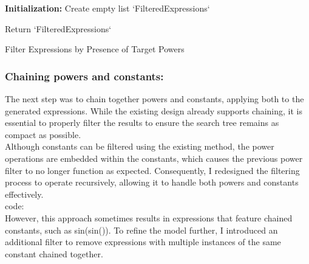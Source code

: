 \documentclass{article}
\begin{document}
\begin{algorithm}[H]
\SetAlgoLined
{}

\textbf{Initialization:}\;
Create empty list `FilteredExpressions`\;


Return `FilteredExpressions`\;

\caption{Filter Expressions by Presence of Target Powers}
\label{alg:filter_powers} %
\end{algorithm}



\subsubsection{Chaining powers and constants:}

The next step was to chain together powers and constants, applying both to the generated expressions. While the existing design already supports chaining, it is essential to properly filter the results to ensure the search tree remains as compact as possible.\\

Although constants can be filtered using the existing method, the power operations are embedded within the constants, which causes the previous power filter to no longer function as expected. Consequently, I redesigned the filtering process to operate recursively, allowing it to handle both powers and constants effectively.\\


code: \\

However, this approach sometimes results in expressions that feature chained constants, such as sin(sin()). To refine the model further, I introduced an additional filter to remove expressions with multiple instances of the same constant chained together.\\
\end{document}
